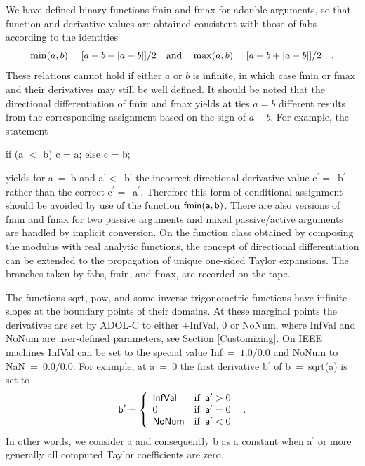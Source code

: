 \documentclass[11pt,twoside]{article}
\begin{document}
We have defined binary functions {\sf fmin} and {\sf fmax} for {\sf adouble}
arguments, so that function and derivative values are obtained consistent
with those of {\sf fabs} according to the identities
\[
 \min(a,b) = [a+b-|a-b|]/2 \quad {\rm and} \quad
 \max(a,b) = [a+b+|a-b|]/2 \quad . 
\]
These relations cannot hold if either $a$ or $b$ is infinite, in which
case {\sf fmin} or {\sf fmax} and their derivatives may still be well
defined. It should be noted that the directional differentiation of
{\sf fmin} and {\sf fmax} yields at ties $a=b$ different results from
the corresponding assignment based on the sign of $a-b$. For example,
the statement 
\begin{center}
 {\sf if (a $<$ b) c = a; else c = b;}
\end{center} 
yields for {\sf a}~=~{\sf b} and {\sf a}$^\prime < $~{\sf b}$^\prime$
the incorrect directional derivative value 
{\sf c}$^\prime = $~{\sf  b}$^\prime$ rather than the correct
{\sf c}$^\prime = $~{\sf  a}$^\prime$. Therefore this form of conditional assignment
should be avoided by use of the function $\sf fmin(a,b)$. There
are also versions of {\sf fmin} and {\sf fmax} for two passive 
arguments and mixed passive/active arguments are handled by 
implicit conversion. 
On the function class obtained by composing the modulus with real
analytic functions, the concept of directional differentiation can be
extended to the propagation of unique one-sided Taylor expansions.
The branches taken by {\sf fabs, fmin}, and {\sf fmax}, are recorded 
on the tape. 

The functions {\sf sqrt}, {\sf pow}, and some inverse trigonometric
functions have infinite slopes at the boundary points of their domains.
At these marginal points the derivatives are set by ADOL-C to 
either {\sf $\pm$InfVal}, 0
or {\sf NoNum}, where {\sf InfVal} and {\sf NoNum} are user-defined 
parameters, see Section \ref{Customizing}.
On IEEE machines {\sf InfVal} can be set to the special value 
{\sf Inf}~=~$1.0/0.0$ and {\sf NoNum} to {\sf NaN}~=~$0.0/0.0$.
For example, at {\sf a}~=~0 the first derivative {\sf b}$^\prime$ 
of {\sf b}~=~{\sf sqrt(a)} is set to 
\[
{\sf b}^\prime = \left\{
\begin{array}{ll}
\sf InfVal&\mbox{if}\;\; {\sf a}^\prime>0  \\
0&\mbox{if}\;\;{\sf a}^\prime =0 \\
\sf NoNum&\mbox{if}\;\;{\sf a}^\prime <0\\
\end{array} \right.  \enspace .
\]
In other words, we consider {\sf a} and
consequently {\sf b}  as a constant when {\sf a}$^\prime$ or more generally
all computed Taylor coefficients are zero. 
\end{document}
